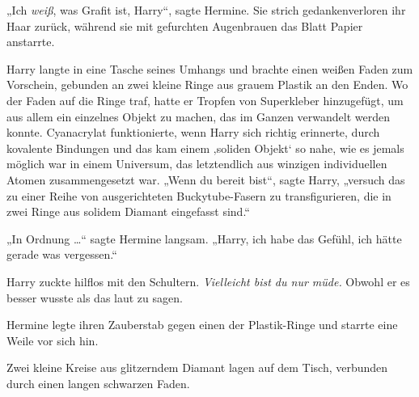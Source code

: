 „Ich \emph{weiß}, was Grafit ist, Harry“, sagte Hermine. Sie strich gedankenverloren ihr Haar zurück, während sie mit gefurchten Augenbrauen das Blatt Papier anstarrte.

Harry langte in eine Tasche seines Umhangs und brachte einen weißen Faden zum Vorschein, gebunden an zwei kleine Ringe aus grauem Plastik an den Enden. Wo der Faden auf die Ringe traf, hatte er Tropfen von Superkleber hinzugefügt, um aus allem ein einzelnes Objekt zu machen, das im Ganzen verwandelt werden konnte. Cyanacrylat funktionierte, wenn Harry sich richtig erinnerte, durch kovalente Bindungen und das kam einem ‚soliden Objekt‘ so nahe, wie es jemals möglich war in einem Universum, das letztendlich aus winzigen individuellen Atomen zusammengesetzt war.
„Wenn du bereit bist“, sagte Harry, „versuch das zu einer Reihe von ausgerichteten Buckytube-Fasern zu transfigurieren, die in zwei Ringe aus solidem Diamant eingefasst sind.“

„In Ordnung …“ sagte Hermine langsam.
„Harry, ich habe das Gefühl, ich hätte gerade was vergessen.“

Harry zuckte hilflos mit den Schultern. \emph{Vielleicht bist du nur müde.} Obwohl er es besser wusste als das laut zu sagen.

Hermine legte ihren Zauberstab gegen einen der Plastik-Ringe und starrte eine Weile vor sich hin.

Zwei kleine Kreise aus glitzerndem Diamant lagen auf dem Tisch, verbunden durch einen langen schwarzen Faden.

